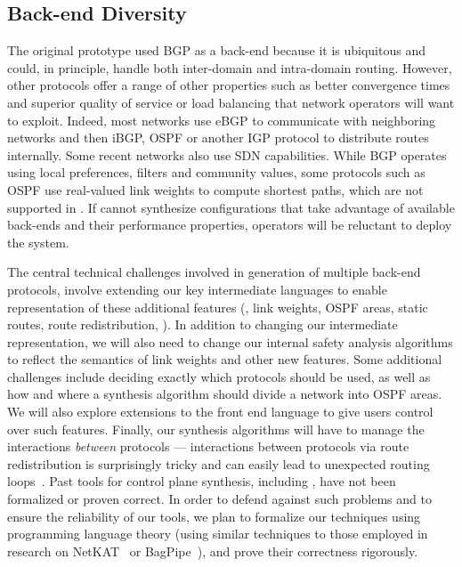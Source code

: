 \subsection{Back-end Diversity}
\label{sec:diversity}

The original \Propane prototype used BGP as a back-end because it is ubiquitous and
could, in principle, handle both inter-domain and 
intra-domain routing.  However, other protocols offer a range of other properties
such as better convergence times and superior quality of service or load balancing that network operators 
will want to exploit.  
%
Indeed, most networks use
eBGP to communicate with neighboring networks and 
then iBGP, OSPF or another IGP protocol to distribute routes internally.
Some recent networks also use SDN capabilities.
While BGP operates using local preferences, filters and community values,
some protocols such as OSPF
use real-valued link weights to compute shortest paths, which are not
supported in \Propane.  
If \Name cannot synthesize configurations that take advantage of available
back-ends and their performance properties, 
operators will be reluctant to deploy the system.

The central technical challenges involved in generation of multiple back-end protocols, involve
extending our key intermediate languages to enable representation 
of these additional features (\eg, link weights, OSPF areas, static routes,
route redistribution, \etc).  
In addition to changing our intermediate representation, we will also need to 
change our internal safety analysis algorithms to reflect the semantics of 
link weights and other new features.
Some additional challenges include deciding exactly which protocols should be used,
as well as how and where
a synthesis algorithm should divide a network into OSPF areas.  We will also
explore extensions to the \Name front end language to give users
control over such features.
Finally, our synthesis algorithms will have to manage the interactions
\emph{between} protocols --- interactions between protocols via route redistribution
is surprisingly tricky and can easily lead to unexpected routing loops~\cite{cisco-route-redistribution}.
Past tools for control plane synthesis, including \Propane, have not been formalized or proven correct. 
In order to defend against such problems and to ensure the reliability of our tools, we plan to formalize 
our techniques using programming language
theory (using similar techniques to those employed in research on NetKAT~\cite{netkat} or BagPipe~\cite{bagpipe}), and prove their correctness
rigorously.

